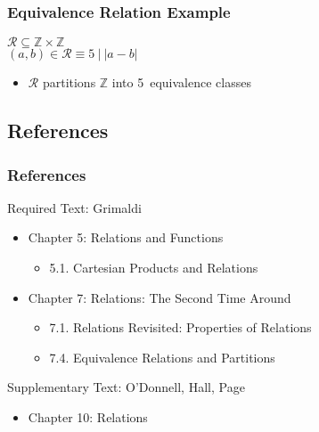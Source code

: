 \documentclass[dvipsnames]{beamer}
\begin{document}
\begin{frame}
  \frametitle{Equivalence Relation Example}

  \begin{example}
    $\mathcal{R} \subseteq \mathbb{Z} \times \mathbb{Z}$\\
    $(a,b) \in \mathcal{R} \equiv 5~|~|a - b|$

    \bigskip
    \begin{itemize}
      \item $\mathcal{R}$ partitions $\mathbb{Z}$ into 5~equivalence classes
    \end{itemize}
  \end{example}
\end{frame}

\subsection*{References}

\begin{frame}
  \frametitle{References}

  \begin{block}{Required Text: Grimaldi}
    \begin{itemize}
      \item Chapter 5: Relations and Functions
      \begin{itemize}
        \item 5.1. \alert{Cartesian Products and Relations}
      \end{itemize}
      \item Chapter 7: Relations: The Second Time Around
      \begin{itemize}
        \item 7.1. \alert{Relations Revisited: Properties of Relations}
        \item 7.4. \alert{Equivalence Relations and Partitions}
      \end{itemize}
    \end{itemize}
  \end{block}

  \begin{block}{Supplementary Text: O'Donnell, Hall, Page}
    \begin{itemize}
      \item Chapter 10: Relations
    \end{itemize}
  \end{block}
\end{frame}
\end{document}
